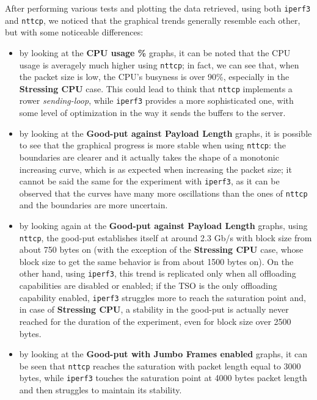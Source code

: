 \documentclass{exam}
\begin{document}
After performing various tests and plotting the data retrieved, using both \texttt{iperf3} and \texttt{nttcp}, we noticed that the graphical trends generally resemble each other, but with some noticeable differences:
\begin{itemize}
    \item by looking at the \textbf{CPU usage \%} graphs, it can be noted that the CPU usage is averagely much higher using \texttt{nttcp}; in fact, we can see that, when the packet size is low, the CPU's busyness is over 90\%, especially in the \textbf{Stressing CPU} case. This could lead to think that \texttt{nttcp} implements a rower \textit{sending-loop}, while \texttt{iperf3} provides a more sophisticated one, with some level of optimization in the way it sends the buffers to the server.
    \item by looking at the \textbf{Good-put against Payload Length} graphs, it is possible to see that the graphical progress is more stable when using \texttt{nttcp}: the boundaries are clearer and it actually takes the shape of a monotonic increasing curve, which is as expected when increasing the packet size; it cannot be said the same for the experiment with \texttt{iperf3}, as it can be observed that the curves have many more oscillations than the ones of \texttt{nttcp} and the boundaries are more uncertain.
    \item by looking again at the \textbf{Good-put against Payload Length} graphs, using \texttt{nttcp}, the good-put establishes itself at around 2.3 Gb/s with block size from about 750 bytes on (with the exception of the \textbf{Stressing CPU} case, whose block size to get the same behavior is from about 1500 bytes on). On the other hand, using \texttt{iperf3}, this trend is replicated only when all offloading capabilities are disabled or enabled; if the TSO is the only offloading capability enabled, \texttt{iperf3} struggles more to reach the saturation point and, in case of \textbf{Stressing CPU}, a stability in the good-put is actually never reached for the duration of the experiment, even for block size over 2500 bytes.
    \item by looking at the \textbf{Good-put with Jumbo Frames enabled} graphs, it can be seen that \texttt{nttcp} reaches the saturation with packet length equal to 3000 bytes, while \texttt{iperf3} touches the saturation point at 4000 bytes packet length and then struggles to maintain its stability.
\end{itemize}
\end{document}
